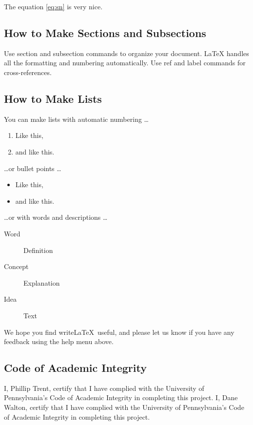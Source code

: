 \documentclass[a4paper]{article}
\begin{document}
The equation \ref{eq:sn} is very nice.

\subsection{How to Make Sections and Subsections}

Use section and subsection commands to organize your document. \LaTeX{} handles all the formatting and numbering automatically. Use ref and label commands for cross-references.

\subsection{How to Make Lists}

You can make lists with automatic numbering \dots

\begin{enumerate}
\item Like this,
\item and like this.
\end{enumerate}
\dots or bullet points \dots
\begin{itemize}
\item Like this,
\item and like this.
\end{itemize}
\dots or with words and descriptions \dots
\begin{description}
\item[Word] Definition
\item[Concept] Explanation
\item[Idea] Text
\end{description}

We hope you find write\LaTeX\ useful, and please let us know if you have any feedback using the help menu above.


\subsection{Code of Academic Integrity}
I, Phillip Trent, certify that I have complied with the University of Pennsylvania’s Code of Academic Integrity in completing this project.
I, Dane Walton, certify that I have complied with the University of Pennsylvania’s Code of Academic Integrity in completing this project.
\end{document}
